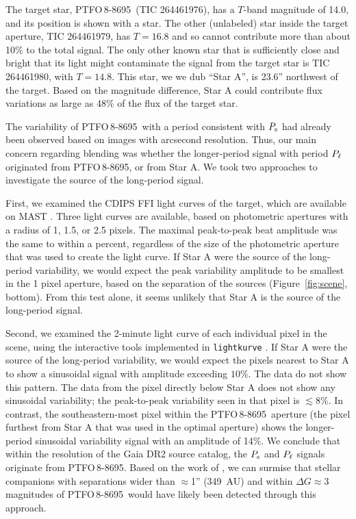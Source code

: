 \documentclass[12pt,twocolumn,tighten,trackchanges]{aastex62}
\newcommand{\ptfo}{PTFO$\,$8-8695}
\begin{document}
The target star, \ptfo\ (TIC 264461976), has a $T$-band magnitude of
14.0, and its position is shown with a star.  The other (unlabeled)
star inside the target aperture, TIC 264461979, has $T=16.8$ and so
cannot contribute more than about 10\% to the total signal.  The only
other known star that is sufficiently close and bright that its light
might contaminate the signal from the target star is TIC 264461980,
with $T=14.8$.  This star, we we dub ``Star A'', is 23.6'' northwest
of the target. Based on the magnitude difference, Star A could
contribute flux variations as large as 48\% of the flux of the target
star.

The variability of \ptfo\ with a period consistent with $P_{\rm s}$
had already been observed based on images with arcsecond resolution.
Thus, our main concern regarding blending was whether the
longer-period signal with period $P_{\rm \ell}$ originated from \ptfo,
or from Star A. We took two approaches to investigate the source of
the long-period signal.

First, we examined the CDIPS FFI light curves of the target, which are
available on MAST \citep{bouma_cluster_2019}. Three light curves are
available, based on photometric apertures with a radius of 1, 1.5, or
2.5 pixels. The maximal peak-to-peak beat amplitude was the same to
within a percent, regardless of the size of the photometric aperture
that was used to create the light curve.  If Star A were the source of
the long-period variability, we would expect the peak variability
amplitude to be smallest in the 1 pixel aperture, based on the
separation of the sources (Figure~\ref{fig:scene}, bottom).  From this
test alone, it seems unlikely that Star A is the source of the
long-period signal.

Second, we examined the 2-minute light curve of each individual pixel
in the scene, using the interactive tools implemented in
\texttt{lightkurve} \citep{lightkurve_2018}.  If Star A were the
source of the long-period variability, we would expect the pixels
nearest to Star A to show a sinusoidal signal with amplitude exceeding
$10\%$.  The data do not show this pattern.  The data from the pixel
directly below Star A does not show any sinusoidal variability; the
peak-to-peak variability seen in that pixel is $\lesssim 8\%$.  In
contrast, the southeastern-most pixel within the \ptfo\ aperture (the
pixel furthest from Star A that was used in the optimal aperture)
shows the longer-period sinusoidal variability signal with an
amplitude of 14\%.  We conclude that within the resolution of the Gaia
DR2 source catalog, the $P_{\rm s}$ and $P_{\rm \ell}$ signals
originate from \ptfo.  Based on the work of
\citet{ziegler_measuring_2018}, we can surmise that stellar companions
with separations wider than $\approx$1'' (349~AU) and within $\Delta G
\approx 3$ magnitudes of \ptfo\ would have likely been detected
through this approach. 
\end{document}
